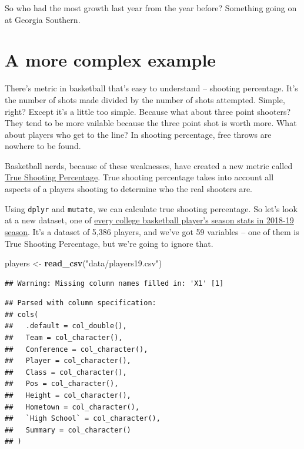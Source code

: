 \documentclass[
]{book}
\newenvironment{Shaded}{\begin{snugshade}}{\end{snugshade}}
\newcommand{\KeywordTok}[1]{\textcolor[rgb]{0.13,0.29,0.53}{\textbf{#1}}}
\newcommand{\NormalTok}[1]{#1}
\newcommand{\StringTok}[1]{\textcolor[rgb]{0.31,0.60,0.02}{#1}}
\begin{document}
So who had the most growth last year from the year before? Something going on at Georgia Southern.

\hypertarget{a-more-complex-example}{%
\section{A more complex example}\label{a-more-complex-example}}

There's metric in basketball that's easy to understand -- shooting percentage. It's the number of shots made divided by the number of shots attempted. Simple, right? Except it's a little too simple. Because what about three point shooters? They tend to be more vailable because the three point shot is worth more. What about players who get to the line? In shooting percentage, free throws are nowhere to be found.

Basketball nerds, because of these weaknesses, have created a new metric called \href{https://en.wikipedia.org/wiki/True_shooting_percentage}{True Shooting Percentage}. True shooting percentage takes into account all aspects of a players shooting to determine who the real shooters are.

Using \texttt{dplyr} and \texttt{mutate}, we can calculate true shooting percentage. So let's look at a new dataset, one of \href{https://unl.box.com/s/u99ualyzrrzucunr9edd3m4gvgvorez6}{every college basketball player's season stats in 2018-19 season}. It's a dataset of 5,386 players, and we've got 59 variables -- one of them is True Shooting Percentage, but we're going to ignore that.

\begin{Shaded}
\begin{Highlighting}[]
\NormalTok{players <-}\StringTok{ }\KeywordTok{read_csv}\NormalTok{(}\StringTok{"data/players19.csv"}\NormalTok{)}
\end{Highlighting}
\end{Shaded}

\begin{verbatim}
## Warning: Missing column names filled in: 'X1' [1]
\end{verbatim}

\begin{verbatim}
## Parsed with column specification:
## cols(
##   .default = col_double(),
##   Team = col_character(),
##   Conference = col_character(),
##   Player = col_character(),
##   Class = col_character(),
##   Pos = col_character(),
##   Height = col_character(),
##   Hometown = col_character(),
##   `High School` = col_character(),
##   Summary = col_character()
## )
\end{verbatim}
\end{document}
